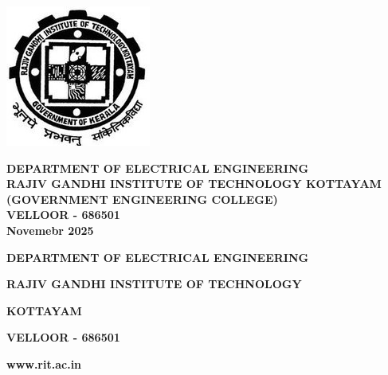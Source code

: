 \documentclass[12pt,a4paper]{report}
\begin{document}
\begin{center}

 

\vspace{0.3cm}

 

\includegraphics[scale=0.5]{imagerit.png}

 

\textbf{DEPARTMENT OF ELECTRICAL ENGINEERING}\\

 

\textbf{RAJIV GANDHI INSTITUTE OF TECHNOLOGY KOTTAYAM}\\

 

\textbf{(GOVERNMENT ENGINEERING COLLEGE)} \\

 

\textbf{VELLOOR - 686501} \\

 

\textbf{Novemebr 2025}\\

 

\end{center}

 


 

\newpage

\begin{center}
    

 \pagestyle{roman}


\textbf{\large DEPARTMENT OF ELECTRICAL ENGINEERING }

 

\textbf{\large RAJIV GANDHI INSTITUTE OF TECHNOLOGY }

 

\textbf{\large KOTTAYAM}

 

\textbf{\large VELLOOR - 686501 }

 

\textbf{\large www.rit.ac.in }

\end{center}
\end{document}
